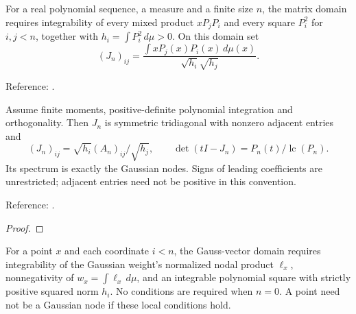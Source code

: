 \begin{definition}
\label{def:normalized-jacobi-matrix}
\leanok
For a real polynomial sequence, a measure and a finite size $n$, the matrix domain requires integrability of every mixed product $xP_jP_i$ and every square $P_i^2$ for $i,j<n$, together with $h_i=\int P_i^2\,d\mu>0$. On this domain set
\[
 (J_n)_{ij}=\frac{\int xP_j(x)P_i(x)\,d\mu(x)}{\sqrt{h_i}\sqrt{h_j}}.
\]


Reference: \cite[3.5(vi)]{dlmf}.
\end{definition}

\begin{theorem}
\label{thm:normalized-jacobi-spectrum}
\leanok
Assume finite moments, positive-definite polynomial integration and orthogonality.
Then $J_n$ is symmetric tridiagonal with nonzero adjacent entries and
\[
 (J_n)_{ij}=\sqrt{h_i}(A_n)_{ij}/\sqrt{h_j},\qquad
 \det(tI-J_n)=P_n(t)/\operatorname{lc}(P_n).
\]
Its spectrum is exactly the Gaussian nodes. Signs of leading coefficients are
unrestricted; adjacent entries need not be positive in this convention.

Reference: \cite[3.5(vi)]{dlmf}.
\end{theorem}
\begin{proof}
\leanok
\end{proof}

\begin{definition}
\label{def:gauss-vector-input}
\leanok
For a point $x$ and each coordinate $i<n$, the Gauss-vector domain requires integrability of the Gaussian
weight's normalized nodal product $\ell_x$, nonnegativity of $w_x=\int\ell_x\,d\mu$, and an
integrable polynomial square with strictly positive squared norm $h_i$.
No conditions are required when $n=0$. A point need not be a Gaussian node if these
local conditions hold.
\end{definition}

